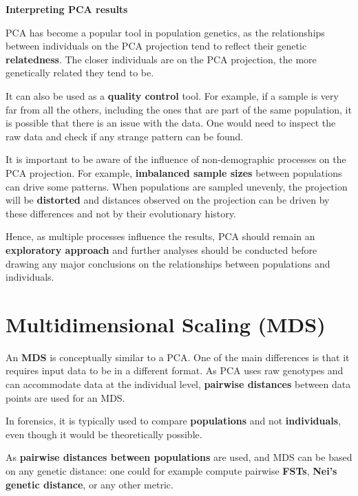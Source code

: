 \documentclass[
]{book}
\begin{document}
\begin{interpretation}
\textbf{Interpreting PCA results}

PCA has become a popular tool in population genetics, as the relationships between
individuals on the PCA projection tend to reflect their genetic \textbf{relatedness}. The
closer individuals are on the PCA projection, the more genetically related they tend to be.

It can also be used as a \textbf{quality control} tool. For example, if a sample is very far
from all the others, including the ones that are part of the same population,
it is possible that there is an issue with the data. One would need to inspect
the raw data and check if any strange pattern can be found.

It is important to be aware of the influence of non-demographic processes on
the PCA projection. For example, \textbf{imbalanced sample sizes} between populations
can drive some patterns. When populations are sampled unevenly, the projection will
be \textbf{distorted} and distances observed on the projection can be driven by these
differences and not by their evolutionary history.

Hence, as multiple processes influence the results, PCA should remain an
\textbf{exploratory approach} and further analyses should be conducted before drawing
any major conclusions on the relationships between populations and individuals.

\end{interpretation}

\hypertarget{multidimensional-scaling-mds}{%
\section{Multidimensional Scaling (MDS)}\label{multidimensional-scaling-mds}}

An \textbf{MDS} is conceptually similar to a PCA. One of the main differences is
that it requires input data to be in a different format. As PCA uses raw genotypes and
can accommodate data at the individual level, \textbf{pairwise distances} between data
points are used for an MDS.

In forensics, it is typically used to compare \textbf{populations} and not
\textbf{individuals}, even though it would be theoretically possible.

As \textbf{pairwise distances between populations} are used, and MDS can be based on
any genetic distance: one could for example compute pairwise \textbf{FSTs},
\textbf{Nei's genetic distance}, or any other metric.
\end{document}

